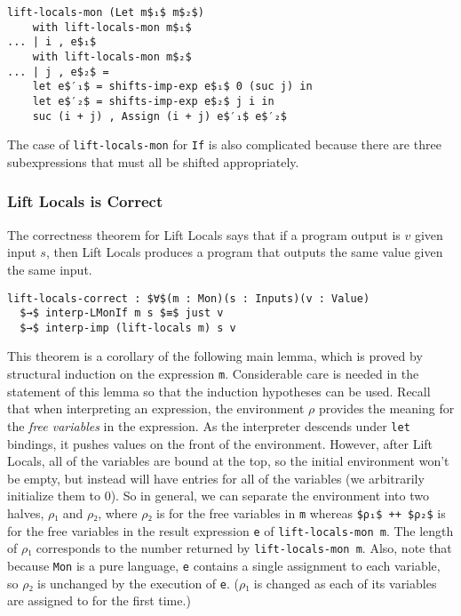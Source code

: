 \documentclass[sigplan,review,dvipsnames,screen,10pt]{acmart}
\begin{document}
\begin{lstlisting}
lift-locals-mon (Let m$₁$ m$₂$)
    with lift-locals-mon m$₁$
... | i , e$₁$
    with lift-locals-mon m$₂$
... | j , e$₂$ =
    let e$′₁$ = shifts-imp-exp e$₁$ 0 (suc j) in
    let e$′₂$ = shifts-imp-exp e$₂$ j i in
    suc (i + j) , Assign (i + j) e$′₁$ e$′₂$
\end{lstlisting}

The case of \lstinline{lift-locals-mon} for \lstinline{If} is also
complicated because there are three subexpressions that must all be
shifted appropriately.

\subsubsection{Lift Locals is Correct}

The correctness theorem for Lift Locals says that if a program output
is $v$ given input $s$, then Lift Locals produces a program that
outputs the same value given the same input.

\begin{lstlisting}
lift-locals-correct : $∀$(m : Mon)(s : Inputs)(v : Value)
  $→$ interp-LMonIf m s $≡$ just v
  $→$ interp-imp (lift-locals m) s v
\end{lstlisting}

This theorem is a corollary of the following main lemma, which is
proved by structural induction on the expression \lstinline{m}.
Considerable care is needed in the statement of this lemma so that the
induction hypotheses can be used. Recall that when interpreting an
expression, the environment $ρ$ provides the meaning for the
\emph{free variables} in the expression.  As the interpreter descends
under \lstinline{let} bindings, it pushes values on the front of the
environment. However, after Lift Locals, all of the variables are
bound at the top, so the initial environment won't be empty, but
instead will have entries for all of the variables (we arbitrarily
initialize them to $0$). So in general, we can separate the
environment into two halves, $ρ₁$ and $ρ₂$, where $ρ₂$ is for the free
variables in \lstinline{m} whereas \lstinline{$ρ₁$ ++ $ρ₂$} is for the
free variables in the result expression \lstinline{e} of
\lstinline{lift-locals-mon m}. The length of $ρ₁$ corresponds to the
number returned by \lstinline{lift-locals-mon m}. Also, note that
because \lstinline{Mon} is a pure language, \lstinline{e} contains a
single assignment to each variable, so $ρ₂$ is unchanged by the
execution of \lstinline{e}. ($ρ₁$ is changed as each of its variables
are assigned to for the first time.)
\end{document}
